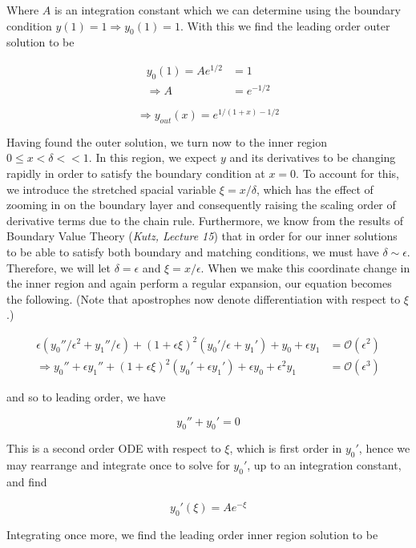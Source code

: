 \documentclass[12pt, a4paper]{article}
\begin{document}
\begin{enumerate}
\begin{enumerate}
        Where $A$ is an integration constant which we can determine using the boundary condition $y(1)=1 \Rightarrow y_0(1) = 1$. With this we find the leading order outer solution to be

        \begin{align*}
            y_0(1) = A e^{1/2} &= 1\\
            \Rightarrow A &= e^{-1/2}
        \end{align*}

        $$\Rightarrow y_{out}(x) = e^{1/(1+x)-1/2}$$

        Having found the outer solution, we turn now to the inner region $0 \le x < \delta << 1$. In this region, we expect $y$ and its derivatives to be changing rapidly in order to satisfy the boundary condition at $x=0$. To account for this, we introduce the stretched spacial variable $\xi = x/\delta$, which has the effect of zooming in on the boundary layer and consequently raising the scaling order of derivative terms due to the chain rule. Furthermore, we know from the results of Boundary Value Theory (\textit{Kutz, Lecture 15}) that in order for our inner solutions to be able to satisfy both boundary and matching conditions, we must have $\delta \sim \epsilon$. Therefore, we will let $\delta=\epsilon$ and $\xi = x/\epsilon$. When we make this coordinate change in the inner region and again perform a regular expansion, our equation becomes the following. (Note that apostrophes now denote differentiation with respect to $\xi$.)

        \begin{align*}
            \epsilon(y_0''/\epsilon^2 + y_1''/\epsilon) + (1+\epsilon \xi)^2(y_0'/\epsilon + y_1') + y_0 + \epsilon y_1 &= \mathcal{O}(\epsilon^2) \\
            \Rightarrow y_0'' + \epsilon y_1'' + (1+\epsilon \xi)^2(y_0' + \epsilon y_1') + \epsilon y_0 + \epsilon^2 y_1 &= \mathcal{O}(\epsilon^3)
        \end{align*}

        and so to leading order, we have

        $$y_0'' + y_0' = 0$$

        This is a second order ODE with respect to $\xi$, which is first order in $y_0'$, hence we may rearrange and integrate once to solve for $y_0'$, up to an integration constant, and find 

        $$y_0'(\xi) = A e^{-\xi}$$

        Integrating once more, we find the leading order inner region solution to be 


\end{enumerate}
\end{enumerate}
\end{document}
